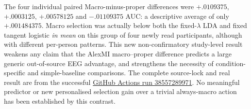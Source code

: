 The four individual paired
Macro-minus-proper differences were
$+.0109375$, $+.0003125$,
$+.00578125$ and $-.01109375$ AUC:
a descriptive average of only
$+.001484375$.
Macro selection was actually below
both the fixed-$\lambda$ LDA and
fixed tangent logistic \emph{in mean}
on this group of four newly read
participants, although with different
per-person patterns. This new
non-confirmatory study-level result
weakens any claim that the AlexMI
macro--proper difference predicts
a large generic out-of-source EEG
advantage, and strengthens the
necessity of condition-specific
and simple-baseline comparisons.
The complete source-lock and real
result are from the successful
\href{https://github.com/lindicaphxag-tech/kaggle/actions/runs/38557289971}
{GitHub Actions run 38557289971}.
No meaningful predictor or new
personalised selection gain over a
trivial always-macro action has
been established by this contrast.
